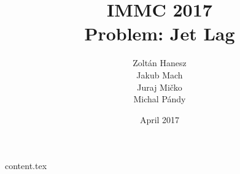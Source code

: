 \documentclass{article}
\title{IMMC 2017 \\
	\large Problem: Jet Lag}
\author{Zoltán Hanesz \\ Jakub Mach \\ Juraj Mičko \\ Michal Pándy}
\date{April 2017}
\begin{document}
\setlength{\abovedisplayskip}{0pt}
\setlength{\abovedisplayskip}{0pt}
\setlength{\belowdisplayskip}{0pt}

\maketitle
{\small\tableofcontents}
	\clearpage

{content.tex}
\end{document}
